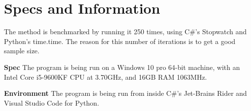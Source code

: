 \section{Specs and Information}
The method is benchmarked by running it 250 times, using C\#'s Stopwatch and Python's time.time. The reason for this number of iterations is to get a good sample size.

\noindent\textbf{Spec} \hspace{4px} The program is being run on a Windows 10 pro 64-bit machine, with an Intel Core i5-9600KF CPU at 3.70GHz, and 16GB RAM 1063MHz.

\noindent\textbf{Environment} \hspace{4px} The program is being run from inside C\#'s Jet-Brains Rider and Visual Studio Code for Python.